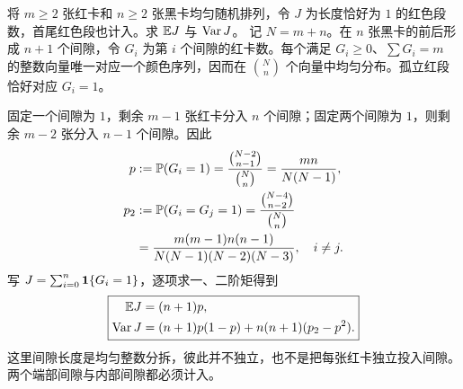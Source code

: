 将 $m\ge2$ 张红卡和 $n\ge2$ 张黑卡均匀随机排列，令 $J$ 为长度恰好为 $1$ 的红色段数，首尾红色段也计入。求 $\mathbb{E} J$ 与 $\operatorname{Var} J$。
\solution 记 $N=m+n$。在 $n$ 张黑卡的前后形成 $n+1$ 个间隙，令 $G_i$ 为第 $i$ 个间隙的红卡数。每个满足 $G_i\ge0$、$\sum G_i=m$ 的整数向量唯一对应一个颜色序列，因而在 $\binom Nn$ 个向量中均匀分布。孤立红段恰好对应 $G_i=1$。

固定一个间隙为 $1$，剩余 $m-1$ 张红卡分入 $n$ 个间隙；固定两个间隙为 $1$，则剩余 $m-2$ 张分入 $n-1$ 个间隙。因此
\[
\begin{aligned}
p&:=\mathbb{P}(G_i=1)=\frac{\binom{N-2}{n-1}}{\binom Nn}
=\frac{mn}{N(N-1)},\\
p_2&:=\mathbb{P}(G_i=G_j=1)
=\frac{\binom{N-4}{n-2}}{\binom Nn}\\
&=\frac{m(m-1)n(n-1)}{N(N-1)(N-2)(N-3)},\quad i\ne j.
\end{aligned}
\]
写 $J=\sum_{i=0}^n\mathbf{1}\{G_i=1\}$，逐项求一、二阶矩得到
\[
\boxed{\begin{aligned}
\mathbb{E} J&=(n+1)p,\\
\operatorname{Var} J&=(n+1)p(1-p)+n(n+1)(p_2-p^2).
\end{aligned}}
\]
\pitfall 这里间隙长度是均匀整数分拆，彼此并不独立，也不是把每张红卡独立投入间隙。两个端部间隙与内部间隙都必须计入。
